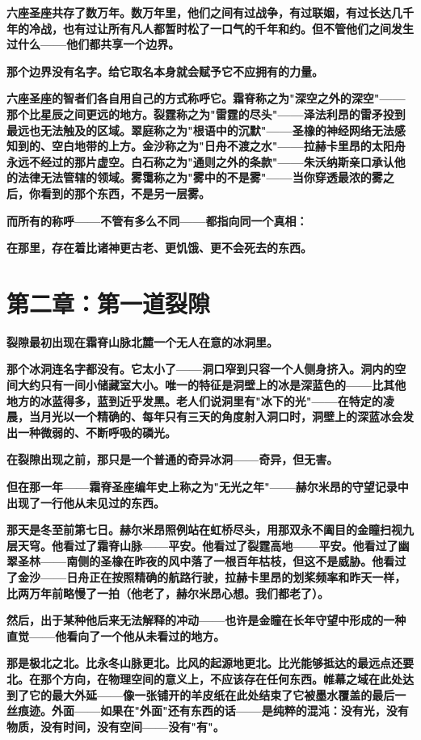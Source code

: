 \documentclass[12pt,a4paper,openany]{ctexbook}
\begin{document}
\textbf{六座圣座共存了数万年。数万年里，他们之间有过战争，有过联姻，有过长达几千年的冷战，也有过让所有凡人都暂时松了一口气的千年和约。但不管他们之间发生过什么——他们都共享一个边界。}


\textbf{那个边界没有名字。给它取名本身就会赋予它不应拥有的力量。}


\textbf{六座圣座的智者们各自用自己的方式称呼它。霜脊称之为"深空之外的深空"——那个比星辰之间更远的地方。裂霆称之为"雷霆的尽头"——泽法利昂的雷矛投到最远也无法触及的区域。翠庭称之为"根语中的沉默"——圣橡的神经网络无法感知到的、空白地带的上方。金沙称之为"日舟不渡之水"——拉赫卡里昂的太阳舟永远不经过的那片虚空。白石称之为"通则之外的条款"——朱沃纳斯亲口承认他的法律无法管辖的领域。雾霭称之为"雾中的不是雾"——当你穿透最浓的雾之后，你看到的那个东西，不是另一层雾。}


\textbf{而所有的称呼——不管有多么不同——都指向同一个真相：}


\textbf{在那里，存在着比诸神更古老、更饥饿、更不会死去的东西。}


\section*{第二章：第一道裂隙}


\textbf{裂隙最初出现在霜脊山脉北麓一个无人在意的冰洞里。}


\textbf{那个冰洞连名字都没有。它太小了——洞口窄到只容一个人侧身挤入。洞内的空间大约只有一间小储藏室大小。唯一的特征是洞壁上的冰是深蓝色的——比其他地方的冰蓝得多，蓝到近乎发黑。老人们说洞里有"冰下的光"——在特定的凌晨，当月光以一个精确的、每年只有三天的角度射入洞口时，洞壁上的深蓝冰会发出一种微弱的、不断呼吸的磷光。}


\textbf{在裂隙出现之前，那只是一个普通的奇异冰洞——奇异，但无害。}


\textbf{但在那一年——霜脊圣座编年史上称之为"无光之年"——赫尔米昂的守望记录中出现了一行他从未见过的东西。}


\textbf{那天是冬至前第七日。赫尔米昂照例站在虹桥尽头，用那双永不阖目的金瞳扫视九层天穹。他看过了霜脊山脉——平安。他看过了裂霆高地——平安。他看过了幽翠圣林——南侧的圣橡在昨夜的风中落了一根百年枯枝，但这不是威胁。他看过了金沙——日舟正在按照精确的航路行驶，拉赫卡里昂的划桨频率和昨天一样，比两万年前略慢了一拍（他老了，赫尔米昂心想。我们都老了）。}


\textbf{然后，出于某种他后来无法解释的冲动——也许是金瞳在长年守望中形成的一种直觉——他看向了一个他从未看过的地方。}


\textbf{那是极北之北。比永冬山脉更北。比风的起源地更北。比光能够抵达的最远点还要北。在那个方向，在物理空间的意义上，不应该存在任何东西。帷幕之域在此处达到了它的最大外延——像一张铺开的羊皮纸在此处结束了它被墨水覆盖的最后一丝痕迹。外面——如果在"外面"还有东西的话——是纯粹的混沌：没有光，没有物质，没有时间，没有空间——没有"有"。}
\end{document}
